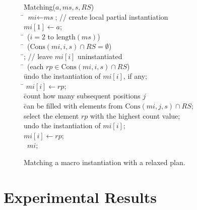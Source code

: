 \documentclass{article}
\begin{document}
\begin{figure}[t]
\begin{center}
\begin{minipage}[c]{\textwidth}
\footnotesize{
\begin{tabbing}
\hspace{0.0em} \= Matching($a, \textit{ms}, s, \textit{RS}$) \\%
\> \quad \= $\textit{mi} \leftarrow \textit{ms}$; // create local partial instantiation \\
\> \> $\textit{mi}[1] \leftarrow a$; \\
\> \quad \= \for \ ($i = 2 \mbox{ to length}(\textit{ms})$) \\ %
\> \> \quad \= \myif \ ($\mbox{Cons}(\textit{mi}, i, s) \cap \textit{RS} = \emptyset$) \\ %
\> \> \> \quad \= \continue; // leave $\textit{mi}[i]$ uninstantiated \\
\> \> \quad \= \for \ (each $\textit{rp} \in \mbox{Cons}(\textit{mi}, i, s) \cap \textit{RS}$) \\ %
\> \> \> \quad \= undo the instantiation of $\textit{mi}[i]$, if any; \\
\> \> \> \quad \= $\textit{mi}[i] \leftarrow \textit{rp}$; \\
\> \> \> \quad \= count how many subsequent positions $j$ \\
\> \> \> \> \quad \= can be filled with elements from $\mbox{Cons}(\textit{mi}, j, s) \cap \textit{RS}$;\\
\> \> \> select the element $\textit{rp}$ with the highest count value; \\
\> \> \> undo the instantiation of $\textit{mi}[i]$; \\
\> \> \> $\textit{mi}[i] \leftarrow \textit{rp}$; \\
\> \> \return \ $\textit{mi}$; %
\end{tabbing}
}
\end{minipage}
\end{center}
\caption{Matching a macro instantiation with a relaxed plan.}
\label{fig:matching}
\end{figure}

\section{Experimental Results}
\label{experimental results}
\end{document}
